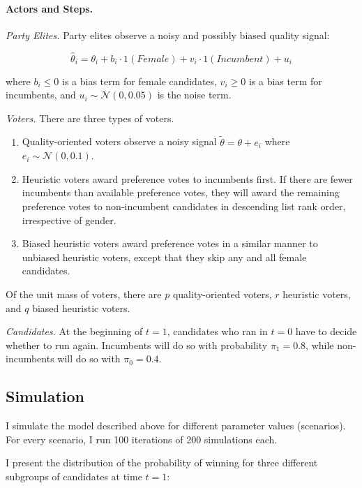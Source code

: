 \documentclass[12pt]{article}
\begin{document}
\paragraph*{Actors and Steps.}


\emph{Party Elites.} Party elites observe a noisy and possibly biased quality signal:

\begin{equation}
\hat{\theta}_i = \theta_i + b_i \cdot 1(Female) + v_i \cdot 1(Incumbent) + u_i
\end{equation}

where $b_i \leq 0$ is a bias term for female candidates, $v_i \geq 0$ is a bias term for incumbents, and $u_i \sim \mathcal{N}(0, 0.05)$ is the noise term.

\emph{Voters.} There are three types of voters.

\begin{enumerate}
    \item Quality-oriented voters observe a noisy signal $\tilde{\theta} = \theta + e_i$ where $e_i \sim \mathcal{N}(0, 0.1)$.
    \item  Heuristic voters award preference votes to incumbents first. If there are fewer incumbents than available preference votes, they will award the remaining preference votes to non-incumbent candidates in descending list rank order, irrespective of gender.
    \item Biased heuristic voters award preference votes in a similar manner to unbiased heuristic voters, except that they skip any and all female candidates.
\end{enumerate}

Of the unit mass of voters, there are $p$ quality-oriented voters, $r$ heuristic voters, and $q$ biased heuristic voters.

\emph{Candidates.} At the beginning of $t = 1$, candidates who ran in $t = 0$ have to decide whether to run again. Incumbents will do so with probability $\pi_1 = 0.8$, while non-incumbents will do so with $\pi_0 = 0.4$.

\subsection{Simulation}

I simulate the model described above for different parameter values (scenarios). For every scenario, I run 100 iterations of 200 simulations each.

I present the distribution of the probability of winning for three different subgroups of candidates at time $t = 1$:
\end{document}
